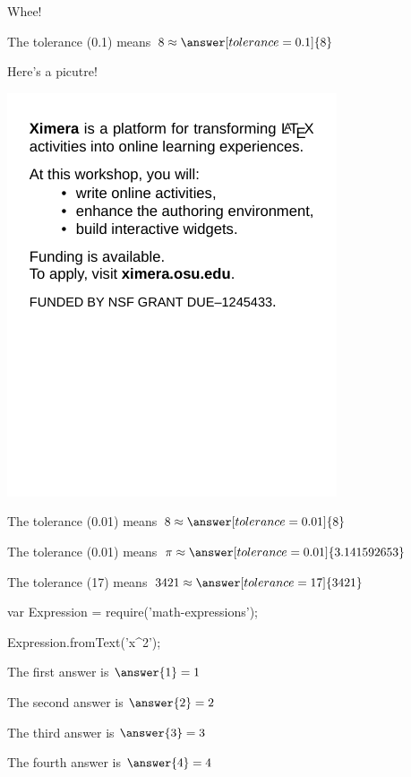 \documentclass{ximera}
\begin{document}
Whee!

\begin{problem}
  The tolerance (0.1) means $8 \approx \answer[tolerance=0.1]{8}$
\end{problem}

Here's a picutre!

\includegraphics{flavor}

\begin{problem}
  The tolerance (0.01) means $8 \approx \answer[tolerance=0.01]{8}$
\end{problem}

\begin{problem}
  The tolerance (0.01) means $\pi \approx \answer[tolerance=0.01]{3.141592653}$
\end{problem}

\begin{problem}
  The tolerance (17) means $3421 \approx \answer[tolerance=17]{3421}$
\end{problem}

\begin{code}
  var Expression = require('math-expressions');

  Expression.fromText('x^2');
\end{code}

\begin{shuffle}
  \begin{problem}
    The first answer is $\answer{1} = 1$
  \end{problem}

  \begin{problem}
    The second answer is $\answer{2} = 2$
  \end{problem}

  \begin{problem}
    The third answer is $\answer{3} = 3$
  \end{problem}

  \begin{problem}
    The fourth answer is $\answer{4} = 4$

  \end{problem}
\end{shuffle}
\end{document}
